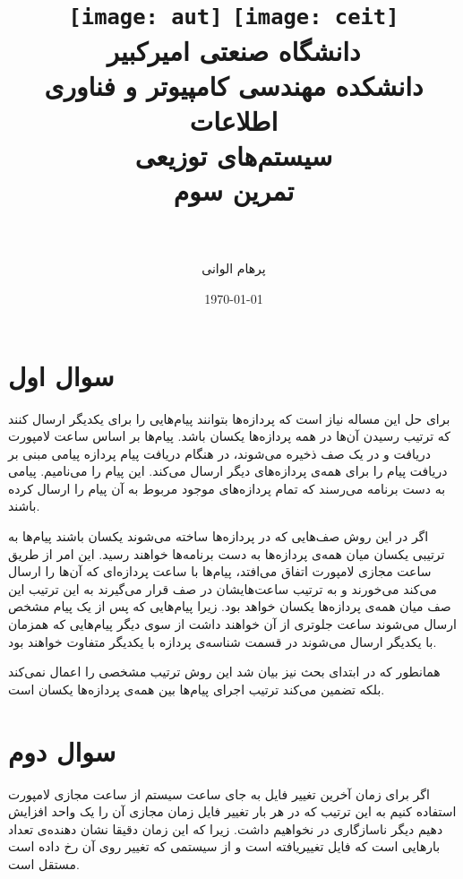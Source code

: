 \documentclass[paper=a4, fontsize=11pt]{article}
\title{
\normalfont\normalsize
\texttt{[image: aut]}
\hspace{5cm}
\texttt{[image: ceit]} \\
\textsc دانشگاه صنعتی امیرکبیر \\
\textsc دانشکده مهندسی کامپیوتر و فناوری اطلاعات
\horrule{0.5pt} \\ [0.4cm] %
\huge سیستم‌های توزیعی \\ %
\huge تمرین سوم \\ %
\horrule{2pt} \\ [0.5cm] %
}
\author{پرهام الوانی}
\date{\normalsize\today} %
\numberwithin{equation}{section} %
\numberwithin{figure}{section} %
\numberwithin{table}{section} %
\begin{document}
\maketitle %

\section{سوال اول}

\indent \par
    برای حل این مساله نیاز است که پردازه‌ها بتوانند پیام‌هایی را برای یکدیگر ارسال کنند که ترتیب رسیدن آن‌ها در همه پردازه‌ها یکسان باشد.
    پیام‌ها بر اساس ساعت لامپورت دریافت و در یک صف ذخیره می‌شوند، در هنگام دریافت پیام پردازه‌ پیامی مبنی بر دریافت پیام را برای همه‌ی پردازه‌های دیگر ارسال می‌کند.
    این پیام را  می‌نامیم.
    پیامی به دست برنامه می‌رسند که تمام پردازه‌های موجود 
    مربوط به آن پیام را ارسال کرده باشند.

\par
    اگر در این روش صف‌هایی که در پردازه‌ها ساخته می‌شوند یکسان باشند پیام‌ها به ترتیبی یکسان میان همه‌ی پردازه‌ها به دست برنامه‌ها خواهند رسید.
    این امر از طریق ساعت مجازی لامپورت اتفاق می‌افتد، پیام‌ها با ساعت پردازه‌ای که آن‌ها را ارسال می‌کند  می‌خورند
    و به ترتیب ساعت‌هایشان در صف قرار می‌گیرند به این ترتیب این صف میان همه‌ی پردازه‌ها یکسان خواهد بود.
    زیرا پیام‌هایی که پس از یک پیام مشخص ارسال می‌شوند ساعت جلوتری از آن خواهند داشت از سوی دیگر
    پیام‌هایی که همزمان با یکدیگر ارسال می‌شوند در قسمت شناسه‌ی پردازه با یکدیگر متفاوت خواهند بود.

\par
    همانطور که در ابتدای بحث نیز بیان شد این روش ترتیب مشخصی را اعمال نمی‌کند بلکه تضمین می‌کند ترتیب اجرای پیام‌ها بین همه‌ی پردازه‌ها یکسان است.


\section{سوال دوم}

\indent \par
    اگر برای زمان آخرین تغییر فایل به جای ساعت سیستم از ساعت مجازی لامپورت استفاده کنیم به این ترتیب که
    در هر بار تغییر فایل زمان مجازی آن را یک واحد افزایش دهیم دیگر ناسازگاری در 
    نخواهیم داشت.
    زیرا که این زمان دقیقا نشان دهنده‌ی تعداد بارهایی است که فایل تغییریافته است و
    از سیستمی که تغییر روی آن رخ داده است مستقل است.
\end{document}
